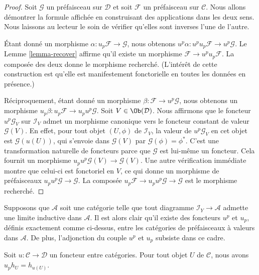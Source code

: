 \begin{proof}
Soit $\mathcal{G}$ un préfaisceau sur $\mathcal{D}$ et soit
$\mathcal{F}$ un préfaisceau sur $\mathcal{C}$.
Nous allons démontrer la formule affichée
en construisant des applications dans les deux sens. Nous laissons
au lecteur le soin de vérifier qu’elles sont inverses l’une de l’autre.

\medskip\noindent
Étant donné un morphisme $\alpha : u_p \mathcal{F} \to \mathcal{G}$,
nous obtenons $u^p\alpha : u^p u_p \mathcal{F} \to u^p \mathcal{G}$.
Le Lemme \ref{lemma-recover} affirme qu’il existe un
morphisme $\mathcal{F} \to u^p u_p \mathcal{F}$. La composée
des deux donne le morphisme recherché. (L’intérêt de cette construction
est qu’elle est manifestement fonctorielle en toutes les données en présence.)

\medskip\noindent
Réciproquement, étant donné un morphisme $\beta : \mathcal{F} \to u^p\mathcal{G}$,
nous obtenons un morphisme $u_p\beta : u_p\mathcal{F} \to u_p u^p\mathcal{G}$.
Soit $V \in \Ob(\mathcal{D})$.
Nous affirmons que le foncteur $u^p\mathcal{G}_V$ sur $\mathcal{I}_V$
admet un morphisme canonique vers le foncteur constant de valeur $\mathcal{G}(V)$.
En effet, pour tout objet $(U, \phi)$ de $\mathcal{I}_V$,
la valeur de $u^p\mathcal{G}_V$ en cet objet est $\mathcal{G}(u(U))$,
qui s’envoie dans $\mathcal{G}(V)$ par $\mathcal{G}(\phi) = \phi^*$.
C’est une transformation naturelle de foncteurs parce que $\mathcal{G}$ est lui-même
un foncteur. Cela fournit un morphisme $u_p u^p \mathcal{G}(V) \to \mathcal{G}(V)$.
Une autre vérification immédiate montre que celui-ci est fonctoriel en $V$,
ce qui donne un morphisme de préfaisceaux $u_p u^p \mathcal{G} \to \mathcal{G}$.
La composée $u_p\mathcal{F} \to u_p u^p\mathcal{G} \to
\mathcal{G}$ est le morphisme recherché.
\end{proof}

\begin{remark}
\label{remark-functoriality-presheaves-values}
Supposons que $\mathcal{A}$ soit une catégorie telle que
tout diagramme $\mathcal{I}_Y \to \mathcal{A}$ admette une
limite inductive dans $\mathcal{A}$. Il est alors clair
qu’il existe des foncteurs $u^p$ et $u_p$, définis
exactement comme ci-dessus, entre les catégories
de préfaisceaux à valeurs dans $\mathcal{A}$.
De plus, l’adjonction du couple
$u^p$ et $u_p$ subsiste dans ce cadre.
\end{remark}

\begin{lemma}
\label{lemma-pullback-representable-presheaf}
Soit $u : \mathcal{C} \to \mathcal{D}$ un foncteur entre catégories.
Pour tout objet $U$ de $\mathcal{C}$, nous avons $u_ph_U = h_{u(U)}$.
\end{lemma}

